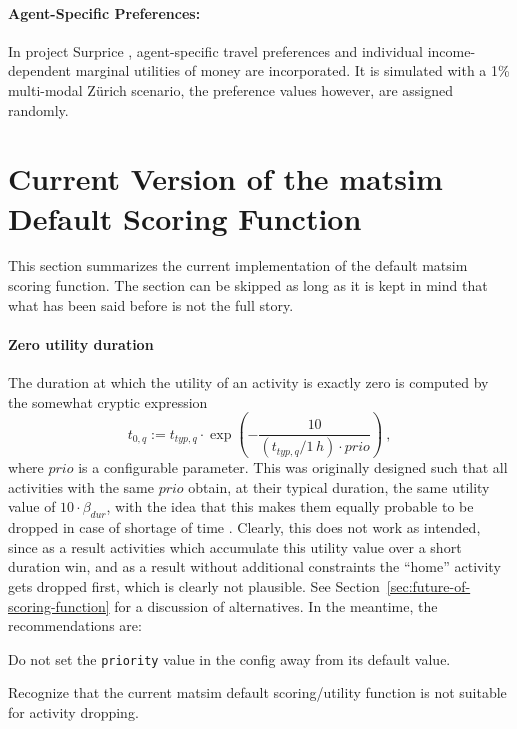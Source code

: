 \paragraph{Agent-Specific Preferences:}
In project Surprice \citet[][]{HorniEtAl_TechRep_IVT_2012_a, HorniAxhausen_TechRep_IVT_2014}, agent-specific travel preferences and individual income-dependent marginal utilities of money are incorporated. It is simulated with a 1\% multi-modal Zürich scenario, the preference values however, are assigned randomly. 

\section{Current Version of the \acrshort{matsim} Default Scoring Function}
\label{sec:scoring-current}

This section summarizes the current implementation of the default \acrshort{matsim} scoring function.  The section can be skipped as long as it is kept in mind that what has been said before is not the full story.


\paragraph*{Zero utility duration}

The duration at which the utility of an activity is exactly zero is computed by the somewhat cryptic expression
\[
t_{0,q} := t_{typ,q} \cdot \exp\left( - \frac{10}{(t_{typ,q}/1\,h) \cdot prio} \right) \ ,
\]
where $prio$ is a configurable parameter.  This was originally designed such that all activities with the same $prio$ obtain, at their typical duration, the same utility value of $10 \cdot \beta_{dur}$, with the idea that this makes them equally probable to be dropped in case of shortage of time \cite{CharyparNagel2005ga4acts}.  Clearly, this does not work as intended, since as a result activities which accumulate this utility value over a short duration win, and as a result without additional constraints the ``home'' activity gets dropped first, which is clearly not plausible.  See Section~\ref{sec:future-of-scoring-function} for a discussion of alternatives.  In the meantime, the recommendations are:
\begin{compactitem}
\item Do not set the \lstinline$priority$ value in the config away from its default value.
\item Recognize that the current \acrshort{matsim} default scoring/utility function is not suitable for activity dropping.
\end{compactitem}


